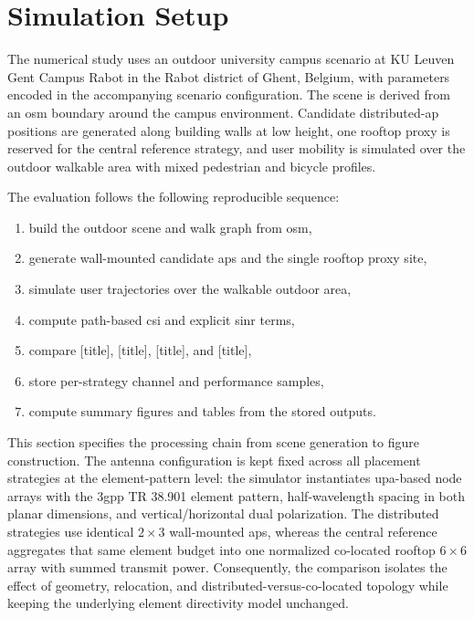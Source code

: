 \section{Simulation Setup}

The numerical study uses an outdoor university campus scenario at KU Leuven Gent Campus Rabot in the Rabot district of Ghent, Belgium, with parameters encoded in the accompanying scenario configuration. The scene is derived from an \gls{osm} boundary around the campus environment. Candidate distributed-\gls{ap} positions are generated along building walls at low height, one rooftop proxy is reserved for the central reference strategy, and user mobility is simulated over the outdoor walkable area with mixed pedestrian and bicycle profiles.

The evaluation follows the following reproducible sequence:
\begin{enumerate}
    \item build the outdoor scene and walk graph from \gls{osm},
    \item generate wall-mounted candidate \glspl{ap} and the single rooftop proxy site,
    \item simulate user trajectories over the walkable outdoor area,
    \item compute path-based \gls{csi} and explicit \gls{sinr} terms,
    \item compare [title], [title], [title], and [title],
    \item store per-strategy channel and performance samples,
    \item compute summary figures and tables from the stored outputs.
\end{enumerate}

This section specifies the processing chain from scene generation to figure construction. The antenna configuration is kept fixed across all placement strategies at the element-pattern level: the simulator instantiates \gls{upa}-based node arrays with the \gls{3gpp} TR 38.901 element pattern, half-wavelength spacing in both planar dimensions, and vertical/horizontal dual polarization. The distributed strategies use identical $\num{2}\times\num{3}$ wall-mounted \glspl{ap}, whereas the central reference aggregates that same element budget into one normalized co-located rooftop $\num{6}\times\num{6}$ array with summed transmit power. Consequently, the comparison isolates the effect of geometry, relocation, and distributed-versus-co-located topology while keeping the underlying element directivity model unchanged.

